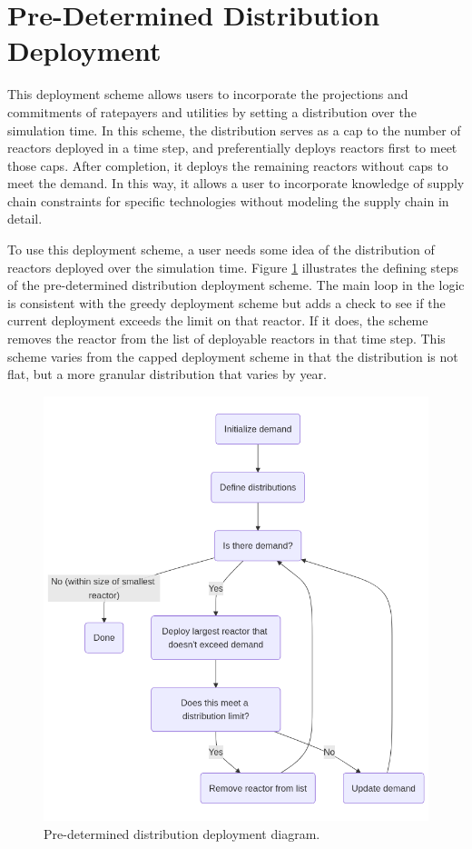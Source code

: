 \section{Pre-Determined Distribution Deployment}
\label{sec:pre_determined_distribution_deployment}
This deployment scheme allows users to incorporate the projections and
commitments of ratepayers and utilities by setting a distribution over the
simulation time. In this scheme, the distribution serves as a cap to the
number of reactors deployed in a time step, and preferentially
deploys reactors first to meet those caps. After completion, it deploys the
remaining reactors without caps to meet the demand. In this way, it allows a user to incorporate knowledge of supply chain constraints for specific technologies without modeling the supply chain in detail.

To use this deployment scheme, a user needs some idea of the distribution of reactors deployed over the simulation time. Figure \ref{fig:pre_det_diagram} illustrates the defining steps of the pre-determined distribution deployment scheme. The main loop in the logic is consistent with the greedy deployment scheme but adds a check to see if the current deployment exceeds the limit on that reactor. If it does, the scheme removes the reactor from the list of deployable reactors in that time step. This scheme varies from the capped deployment scheme in that the distribution is not flat, but a more granular distribution that varies by year.

\begin{figure}[H]
    \centering
    \includegraphics[scale=0.4]{images/schemes/pre_det_diagram.png}
    \caption{Pre-determined distribution deployment diagram.}
    \label{fig:pre_det_diagram}
\end{figure}

